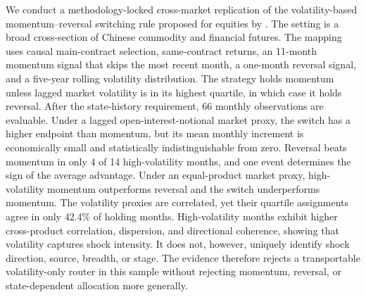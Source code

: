 We conduct a methodology-locked cross-market replication of the volatility-based
momentum--reversal switching rule proposed for equities by \citet{butt2023}. The setting
is a broad cross-section of Chinese commodity and financial futures. The mapping uses
causal main-contract selection, same-contract returns, an 11-month momentum signal that
skips the most recent month, a one-month reversal signal, and a five-year rolling
volatility distribution. The strategy holds momentum unless lagged market volatility is
in its highest quartile, in which case it holds reversal. After the state-history
requirement, 66 monthly observations are evaluable. Under a lagged open-interest-notional
market proxy, the switch has a higher endpoint than momentum, but its mean monthly
increment is economically small and statistically indistinguishable from zero. Reversal
beats momentum in only 4 of 14 high-volatility months, and one event determines the sign
of the average advantage. Under an equal-product market proxy, high-volatility momentum
outperforms reversal and the switch underperforms momentum. The volatility proxies are
correlated, yet their quartile assignments agree in only 42.4\% of holding months.
High-volatility months exhibit higher cross-product correlation, dispersion, and
directional coherence, showing that volatility captures shock intensity. It does not,
however, uniquely identify shock direction, source, breadth, or stage. The evidence
therefore rejects a transportable volatility-only router in this sample without rejecting
momentum, reversal, or state-dependent allocation more generally.
